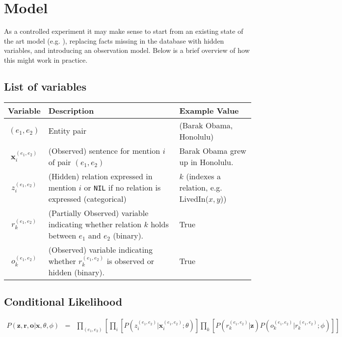 \documentclass[12pt]{article}
\begin{document}
\section{Model}
As a controlled experiment it may make sense to start from an existing state of the art model (e.g. \cite{Hoffmann11}), replacing
facts missing in the database with hidden variables, and introducing an observation model.  Below is a brief overview of how this might work in practice.

\subsection{List of variables}
\begin{center}
\begin{tabular}{|c|p{2in}|p{2in}|}
\hline
Variable & Description & Example Value \\
\hline
\hline
$(e_1,e_2)$ & Entity pair & (Barak Obama, Honolulu)\\
\hline
$\mathbf{x}^{(e_1,e_2)}_i$ & (Observed) sentence for mention $i$ of pair $(e_1,e_2)$ & Barak Obama grew up in Honolulu. \\
\hline
$z^{(e_1,e_2)}_i$ & (Hidden) relation expressed in mention $i$ or {\tt NIL} if no relation is expressed (categorical) & $k$ (indexes a relation, e.g. {\sc LivedIn($x,y$)}) \\
\hline
$r^{(e_1,e_2)}_k$ & (Partially Observed) variable indicating whether relation $k$ holds between $e_1$ and $e_2$ (binary). & {\sc True} \\
\hline
$o^{(e_1,e_2)}_k$ & (Observed) variable indicating whether $r^{(e_1,e_2)}_k$ is observed or hidden (binary). & {\sc True} \\
\hline
\end{tabular}
\end{center}

\subsection{Conditional Likelihood}
\label{conditional_likelihood}
\begin{eqnarray*}
  P(\mathbf{z}, \mathbf{r}, \mathbf{o}|\mathbf{x},\theta,\phi) & = & \prod_{(e_1,e_2)} \left[ \prod_i \left[ P(z^{(e_1,e_2)}_i|\mathbf{x}^{(e_1,e_2)}_i;\theta) \right] \prod_{k} \left[P(r^{(e_1,e_2)}_k|\mathbf{z}) P(o^{(e_1,e_2)}_k|r^{(e_1,e_2)}_k;\phi) \right] \right]\\
\end{eqnarray*}
\end{document}
